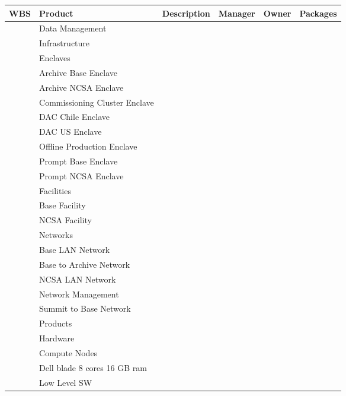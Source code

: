 

\tiny
\begin{longtable}{|p{}|p{}|p{}|p{}|p{}|p{}|}\hline
\textbf{WBS} & Product & Description & Manager & Owner & Packages\\ \hline
 &  Data Management &  &  &  & \\ \hline
 &  Infrastructure &  &  &  & \\ \hline
 &  Enclaves &  &  &  & \\ \hline
 &  Archive Base Enclave &  &  &  & \\ \hline
 &  Archive NCSA Enclave &  &  &  & \\ \hline
 &  Commissioning Cluster Enclave &  &  &  & \\ \hline
 &  DAC Chile Enclave &  &  &  & \\ \hline
 &  DAC US Enclave &  &  &  & \\ \hline
 &  Offline Production Enclave &  &  &  & \\ \hline
 &  Prompt Base Enclave &  &  &  & \\ \hline
 &  Prompt NCSA Enclave &  &  &  & \\ \hline
 &  Facilities &  &  &  & \\ \hline
 &  Base Facility &  &  &  & \\ \hline
 &  NCSA Facility &  &  &  & \\ \hline
 &  Networks &  &  &  & \\ \hline
 &  Base LAN Network &  &  &  & \\ \hline
 &  Base to Archive Network &  &  &  & \\ \hline
 &  NCSA LAN Network &  &  &  & \\ \hline
 &  Network Management &  &  &  & \\ \hline
 &  Summit to Base Network &  &  &  & \\ \hline
 &  Products &  &  &  & \\ \hline
 &  Hardware &  &  &  & \\ \hline
 &  Compute Nodes &  &  &  & \\ \hline
 &  Dell blade 8 cores 16 GB ram &  &  &  & \\ \hline
 &  Low Level SW &  &  &  & \\ \hline

\end{longtable}
